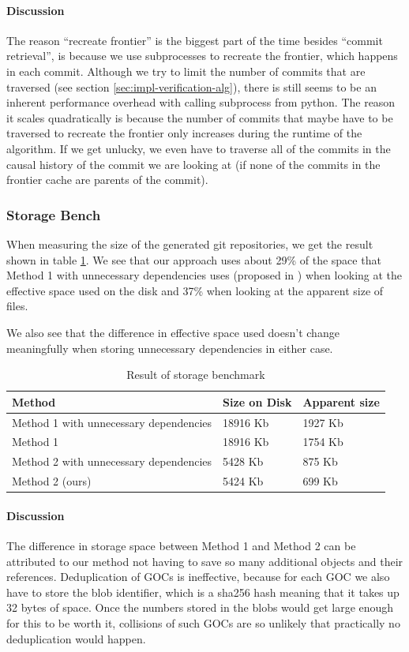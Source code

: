\documentclass{article}
\begin{document}
\paragraph{Discussion}
The reason ``recreate frontier'' is the biggest part of the time besides ``commit retrieval'', is because we use subprocesses to recreate the frontier, which happens in each commit. Although we try to limit the number of commits that are traversed (see section \ref{sec:impl-verification-alg}), there is still seems to be an inherent performance overhead with calling subprocess from python. The reason it scales quadratically is because the number of commits that maybe have to be traversed to recreate the frontier only increases during the runtime of the algorithm. If we get unlucky, we even have to traverse all of the commits in the causal history of the commit we are looking at (if none of the commits in the frontier cache are parents of the commit).

\subsubsection{Storage Bench}
When measuring the size of the generated git repositories, we get the result shown in table \ref{tab:storage-res}. We see that our approach uses about 29\% of the space that Method 1 with unnecessary dependencies uses (proposed in \cite{delta-goc-ledger-heisch}) when looking at the effective space used on the disk and 37\% when looking at the apparent size of files.

We also see that the difference in effective space used doesn't change meaningfully when storing unnecessary dependencies in either case.
\begin{table}
    \begin{tabular}{|p{5cm}|l|l|}
        \hline
        \textbf{Method} & \textbf{Size on Disk} & \textbf{Apparent size}\\ \hline
        Method 1 with unnecessary dependencies & 18916 Kb & 1927 Kb\\\hline
        Method 1 & 18916 Kb & 1754 Kb\\ \hline
        Method 2 with unnecessary dependencies & 5428 Kb & 875 Kb\\ \hline
        Method 2 (ours) & 5424 Kb & 699 Kb\\ \hline
    \end{tabular}
    \caption{Result of storage benchmark}
    \label{tab:storage-res}
\end{table}
\paragraph{Discussion}
The difference in storage space between Method 1 and Method 2 can be attributed to our method not having to save so many additional objects and their references. Deduplication of GOCs is ineffective, because for each GOC we also have to store the blob identifier, which is a sha256 hash meaning that it takes up 32 bytes of space. Once the numbers stored in the blobs would get large enough for this to be worth it, collisions of such GOCs are so unlikely that practically no deduplication would happen.
\end{document}
